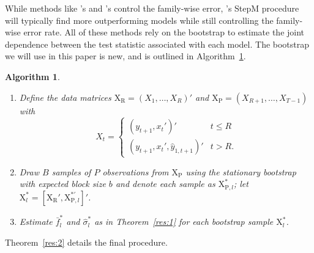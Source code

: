 \documentclass[12pt]{article}
\newcommand\citepos[2][]{\citeauthor{#2}'s \citeyearpar[#1]{#2}}
\newtheorem{alg}{Algorithm}
\theoremstyle{definition}
\newcommand{\X}{\ensuremath{\mathrm{X}}}
\newcommand{\R}{\ensuremath{\mathrm{R}}}
\newcommand{\p}{\ensuremath{\mathrm{P}}}
\begin{document}
While methods like \citepos{Whi:00} and \citepos{Han:05} control the
family-wise error, \citepos{RoW:05} StepM procedure will typically find
more outperforming models while still controlling the family-wise error
rate.  All of these methods rely on the bootstrap to estimate the
joint dependence between the test statistic associated with each
model.  The bootstrap we will use in this paper is new, and is
outlined in Algorithm~\ref{alg:1}.
\begin{alg}\label{alg:1}
  \begin{enumerate}
  \item Define the data matrices $\X_\R = (X_1,\dots,X_R)'$ and $\X_{\p} =
    (X_{R+1},\dots,X_{T-1})$ with
    \begin{equation*}
      X_t = \begin{cases}
        (y_{t+1}, x_t')' & t \leq R \\
        (y_{t+1}, x_t', \hat{y}_{1,t+1})' & t > R.
      \end{cases}
    \end{equation*}
  \item Draw $B$ samples of $P$ observations from $\X_{\p}$ using the
    stationary bootstrap with expected block size $b$ and denote each
    sample as $\X_{\p, l}^{*}$; let $\X_l^{*} = [\X_{\R}', \X_{\p,l}^{*\prime}]'$.
  \item Estimate $\bar{f}^{*}_l$ and $\hat{\sigma}_l^{*}$ as in
    Theorem~\ref{res:1} for each bootstrap sample $\X^{*}_l$.
  \end{enumerate}
\end{alg}

Theorem~\ref{res:2} details the final procedure.
\end{document}
